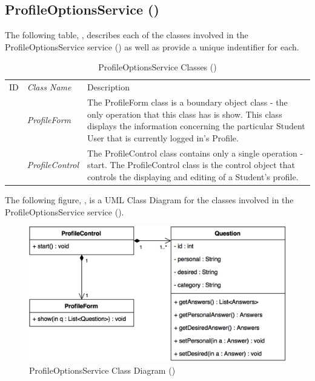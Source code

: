 \documentclass[12pt,letterpaper]{article}
\begin{document}
\subsection{ProfileOptionsService ()}

The following table, , describes each of the classes involved in the ProfileOptionsService service () as well as provide a unique indentifier for each.

\begin{table}[H]
	\caption{ProfileOptionsService Classes ()} 
	\begin{tabu} to 
	    \tableheader{}ID & Class Name & Description \\
		 & ProfileForm & The ProfileForm class is a boundary object class - the only operation that this class has is show. This class displays the information concerning the particular Student User that is currently logged in's Profile.\\
		 & ProfileControl & The ProfileControl class contains only a single operation - start. The ProfileControl class is the control object that controls the displaying and editing of a Student's profile. \\
	\end{tabu}
\end{table}

The following figure, , is a UML Class Diagram for the classes involved in the ProfileOptionsService service ().

\begin{figure}[H]
	\centering{}
	\includegraphics[scale=0.33]{imgs/d3/interfaces/profile-options.png}
	\caption{ProfileOptionsService Class Diagram ()}
\end{figure}
\end{document}
